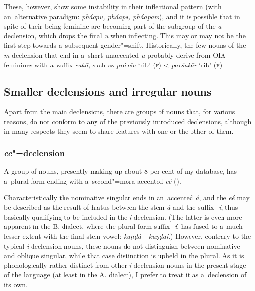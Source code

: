 These, however, show some instability in their inflectional pattern (with an~alternative paradigm: \textit{pháapu, pháapa, pháapam}), and it is possible that in spite of their being feminine are becoming part of the subgroup of the \textit{a}-declension, which drops the final \textit{u} when inflecting. This may or may not be the first step towards a~subsequent gender"=shift. Historically, the few nouns of the \textit{m}-declension that end in a~short unaccented \textit{u} probably derive from OIA feminines with a~suffix \textit{-ukā}, such as \textit{práašu} `rib' (\textsc{f}) {\textless} \textit{paršukā-} `rib' (\textsc{f}).

\subsection{Smaller declensions and irregular nouns}
\label{subsec:4-6-4}

Apart from the main declensions, there are groups of nouns that, for various reasons, do not conform to any of the previously introduced declensions, although in many respects they seem to share features with one or the other of them.

\subsubsection*{\textit{ee}"=declension}

A group of nouns, presently making up about 8 per cent of my database, has a~plural form ending with a~second"=mora accented \textit{eé} (). 


Characteristically the nominative singular ends in an~accented \textit{á}, and the \textit{eé} may be described as the result of hiatus between the stem \textit{á} and the suffix \textit{-í}, thus basically qualifying to be included in the \textit{i}-declension. (The latter is even more apparent in the B. dialect, where the plural form suffix \textit{-í}, has fused to a~much lesser extent with the final stem vowel: \textit{kuṇḍá -} \textit{kuṇḍaí}.) However, contrary to the typical \textit{i}-declension nouns, these nouns do not distinguish between nominative and oblique singular, while that case distinction is upheld in the plural. As it is phonologically rather distinct from other \textit{i}-declension nouns in the present stage of the language (at least in the A. dialect), I prefer to treat it as a~declension of its own.


